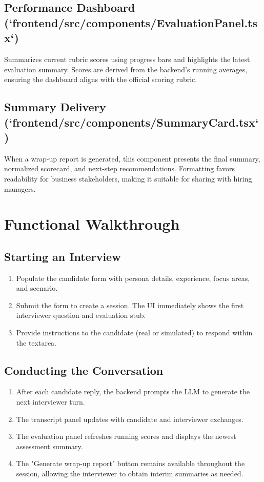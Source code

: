 \documentclass[11pt]{article}
\begin{document}
\subsection{Performance Dashboard (`frontend/src/components/EvaluationPanel.tsx`)}
Summarizes current rubric scores using progress bars and highlights the latest evaluation summary. Scores are derived from the backend's running averages, ensuring the dashboard aligns with the official scoring rubric.

\subsection{Summary Delivery (`frontend/src/components/SummaryCard.tsx`)}
When a wrap-up report is generated, this component presents the final summary, normalized scorecard, and next-step recommendations. Formatting favors readability for business stakeholders, making it suitable for sharing with hiring managers.

\section{Functional Walkthrough}
\subsection{Starting an Interview}
\begin{enumerate}[leftmargin=*]
  \item Populate the candidate form with persona details, experience, focus areas, and scenario.
  \item Submit the form to create a session. The UI immediately shows the first interviewer question and evaluation stub.
  \item Provide instructions to the candidate (real or simulated) to respond within the textarea.
\end{enumerate}

\subsection{Conducting the Conversation}
\begin{enumerate}[leftmargin=*]
  \item After each candidate reply, the backend prompts the LLM to generate the next interviewer turn.
  \item The transcript panel updates with candidate and interviewer exchanges.
  \item The evaluation panel refreshes running scores and displays the newest assessment summary.
  \item The "Generate wrap-up report" button remains available throughout the session, allowing the interviewer to obtain interim summaries as needed.
\end{enumerate}
\end{document}
